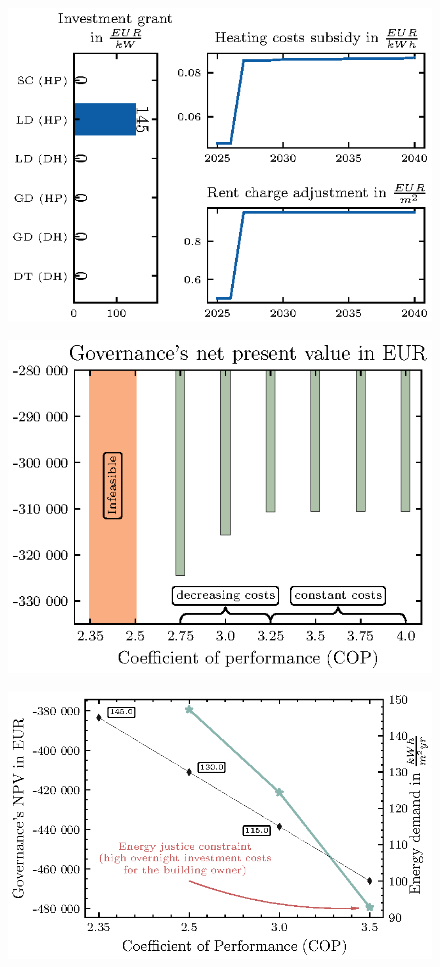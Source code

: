 \begin{figure}[h]
	\centering
	\includegraphics[width=1\linewidth]{figures/4_Results/fig_rent_subsidy_development/price_dev.eps}
	\caption{}
	\label{fig:sub_rent_dev}
\end{figure}

\begin{figure}[h]
	\centering
	\includegraphics[width=0.75\linewidth]{figures/4_Results/fig_cop_sensitivity/cop_sens_an.eps}
	\caption{}
	\label{fig:cop_comparison}
\end{figure}

\begin{figure}[h]
	\centering
	\includegraphics[width=0.75\linewidth]{figures/4_Results/fig_renovation_sens/renovation.eps}
	\caption{}
	\label{fig:cop1}
\end{figure}

